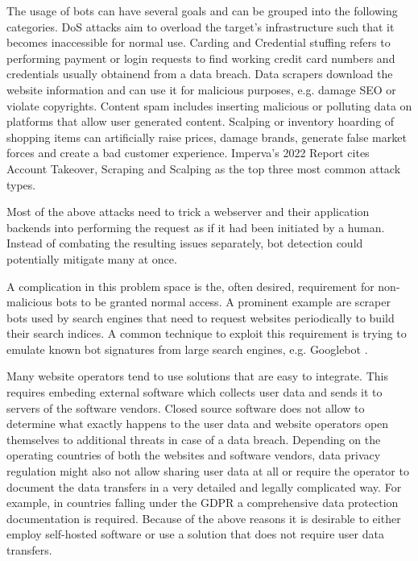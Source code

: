 \documentclass[
    fontsize=12pt,
    headings=small,
    parskip=half,           %
    bibliography=totoc,
    numbers=noenddot,       %
    open=any,               %
    final,                   %
    table
]{scrreprt}
\begin{document}
The usage of bots can have several goals and can be grouped into the following categories. DoS attacks aim to overload the target's infrastructure such that it becomes inaccessible for normal use. Carding and Credential stuffing refers to performing payment or login requests to find working credit card numbers and credentials usually obtainend from a data breach. Data scrapers download the website information and can use it for malicious purposes, e.g. damage SEO or violate copyrights. Content spam includes inserting malicious or polluting data on platforms that allow user generated content. Scalping or inventory hoarding of shopping items can artificially raise prices, damage brands, generate false market forces and create a bad customer experience. Imperva's 2022 Report\cite{BAD_BOT_REPORT2022} cites Account Takeover, Scraping and Scalping as the top three most common attack types.

Most of the above attacks need to trick a webserver and their application backends into performing the request as if it had been initiated by a human. Instead of combating the resulting issues separately, bot detection could potentially mitigate many at once.

A complication in this problem space is the, often desired, requirement for non-malicious bots to be granted normal access. A prominent example are scraper bots used by search engines that need to request websites periodically to build their search indices. A common technique to exploit this requirement is trying to emulate known bot signatures from large search engines, e.g. Googlebot \cite{8421894}.

Many website operators tend to use solutions that are easy to integrate. This requires embeding external software which collects user data and sends it to servers of the software vendors. Closed source software does not allow to determine what exactly happens to the user data and website operators open themselves to additional threats in case of a data breach. Depending on the operating countries of both the websites and software vendors, data privacy regulation might also not allow sharing user data at all or require the operator to document the data transfers in a very detailed and legally complicated way. For example, in countries falling under the GDPR \cite{GDPR} a comprehensive data protection documentation is required. Because of the above reasons it is desirable to either employ self-hosted software or use a solution that does not require user data transfers.
\end{document}
